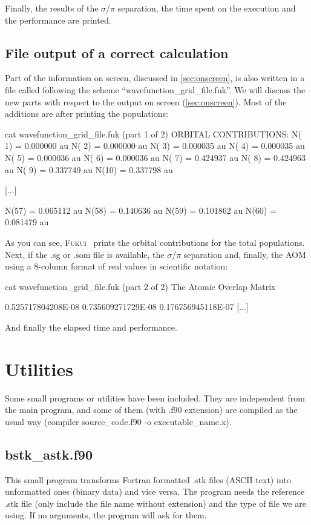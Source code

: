 \documentclass[a4paper,11pt,openany]{memoir}
\newcommand\programa{\textsc{Fukui}}
\begin{document}
Finally, the results of the $\sigma$/$\pi$ separation, the time spent on the execution and the performance are printed.

\section{File output of a correct calculation}\label{sec:file}
Part of the information on screen, discussed in \autoref{sec:onscreen}, is also written in a file called following the scheme ``wavefunction\_grid\_file.fuk''. We will discuss the new parts with respect to the output on screen (\autoref{sec:onscreen}). Most of the additions are after printing the populations:
\begin{consola}{cat wavefunction\_grid\_file.fuk (part 1 of 2)}
    ORBITAL CONTRIBUTIONS:
     N( 1) =     0.000000 au
     N( 2) =     0.000000 au
     N( 3) =     0.000035 au
     N( 4) =     0.000035 au
     N( 5) =     0.000036 au
     N( 6) =     0.000036 au
     N( 7) =     0.424937 au
     N( 8) =     0.424963 au
     N( 9) =     0.337749 au
     N(10) =     0.337798 au

[...]

     N(57) =     0.065112 au
     N(58) =     0.140636 au
     N(59) =     0.101862 au
     N(60) =     0.081479 au
\end{consola}
As you can see, \programa~ prints the orbital contributions for the total populations. Next, if the .sg or .som file is available, the $\sigma$/$\pi$ separation and, finally, the \ac{AOM} using a 8-column format of real values in scientific notation:
\begin{consola}{cat wavefunction\_grid\_file.fuk (part 2 of 2)}
          The Atomic Overlap Matrix



   0.525717804208E-08
   0.735609271729E-08  0.176756945118E-07
[...]
\end{consola}
And finally the elapsed time and performance.

\chapter{Utilities}
Some small programs or utilities have been included. They are independent from the main program, and some of them (with .f90 extension) are compiled as the usual way (compiler source\_code.f90 -o executable\_name.x).

\section{bstk\_astk.f90}
This small program transforms Fortran formatted .stk files (ASCII text) into unformatted ones (binary data) and vice versa. The program needs the reference .stk file (only include the file name without extension) and the type of file we are using. If no arguments, the program will ask for them.
\end{document}
